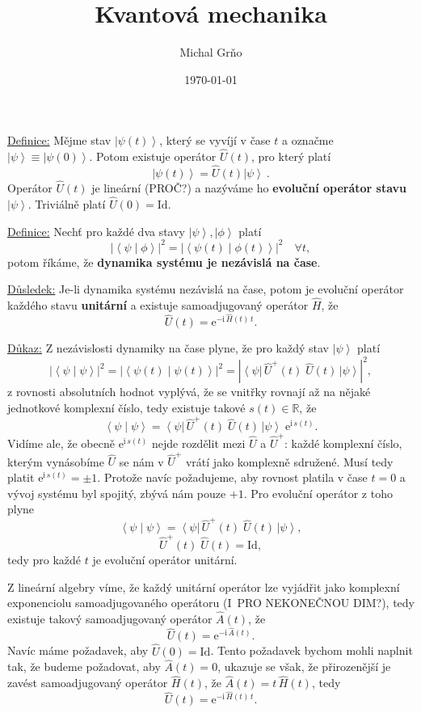 \documentclass[10pt,a4paper]{article}
\newcommand{\const}[1]{\text{#1}}
\newcommand{\abs}[1]{\left| #1 \right|}
\newcommand{\bra}[1]{\left< #1 \right|}
\newcommand{\ket}[1]{\left| #1 \right>}
\newcommand{\braket}[2]{\left< #1 \middle| #2 \right>}
\newcommand{\e}[1]{\const{e}^{#1}}
\renewcommand{\i}{\const{i}}
\def\R{\mathbb{R}}
\def\1{\const{Id}}
\begin{document}
\title{Kvantová mechanika}
\author{Michal Grňo}
\date{\today}

\maketitle

\underline{Definice:}
Mějme stav $\ket{\psi(t)}$, který se vyvíjí v čase $t$ a označme $\ket{\psi} \equiv \ket{\psi(0)}$. Potom existuje operátor $\hat{U}(t)$, pro který platí $$\ket{\psi(t)} = \hat{U}(t) \ket{\psi} \: .$$ Operátor $\hat{U}(t)$ je lineární (PROČ?) a nazýváme ho \textbf{evoluční operátor stavu} $\ket{\psi}$. Triviálně platí $\hat{U}(0) = \1$.

\vspace{2em}
\underline{Definice:}
Nechť pro každé dva stavy $\ket{\psi}, \ket{\phi}$ platí $$\abs{\braket{\psi}{\phi}}^2 = \abs{\braket{\psi(t)}{\phi(t)}}^2 \quad \forall t,$$ potom říkáme, že \textbf{dynamika systému je nezávislá na čase}.

\vspace{2em}
\underline{Důsledek:}
Je-li dynamika systému nezávislá na čase, potom je evoluční operátor každého stavu \textbf{unitární} a existuje samoadjugovaný operátor $\hat{H}$, že $$\hat{U}(t) = \e{-\i \, \hat{H}(t) \, t}.$$

\underline{Důkaz:}
Z nezávislosti dynamiky na čase plyne, že pro každý stav $\ket{\psi}$ platí $$\abs{\braket{\psi}{\psi}}^2 = \abs{\braket{\psi(t)}{\psi(t)}}^2 = \abs{\bra{\psi} \, \hat{U}^+\!(t) \; \hat{U}(t) \, \ket{\psi}}^2,$$ z rovnosti absolutních hodnot vyplývá, že se vnitřky rovnají až na nějaké jednotkové komplexní číslo, tedy existuje takové $s(t) \in \R$, že $$\braket{\psi}{\psi} = \bra{\psi} \, \hat{U}^+\!(t) \; \hat{U}(t) \, \ket{\psi} \; \e{\i \, s(t)}.$$ Vidíme ale, že obecně $\e{\i \, s(t)}$ nejde rozdělit mezi $\hat{U}$ a $\hat{U}^+$: každé komplexní číslo, kterým vynásobíme $\hat{U}$ se nám v $\hat{U}^+$ vrátí jako komplexně sdružené. Musí tedy platit $\e{\i \, s(t)} = \pm 1$. Protože navíc požadujeme, aby rovnost platila v čase $t=0$ a vývoj systému byl spojitý, zbývá nám pouze $+1$. Pro evoluční operátor z toho plyne $$\braket{\psi}{\psi} = \bra{\psi} \, \hat{U}^+\!(t) \; \hat{U}(t) \, \ket{\psi},$$ $$\hat{U}^+ \!(t) \; \hat{U}(t) = \1,$$ tedy pro každé $t$ je evoluční operátor unitární.

Z lineární algebry víme, že každý unitární operátor lze vyjádřit jako komplexní exponenciolu samoadjugovaného operátoru (I~PRO NEKONEČNOU DIM?), tedy existuje takový samoadjugovaný operátor $\hat{A}(t)$, že $$\hat{U}(t) = \e{-\i \, \hat{A}(t)}.$$ Navíc máme požadavek, aby $\hat{U}(0) = \1$. Tento požadavek bychom mohli naplnit tak, že budeme požadovat, aby $\hat{A}(t) = 0$, ukazuje se však, že přirozenější je zavést samoadjugovaný operátor $\hat{H}(t)$, že $\hat{A}(t) = t \, \hat{H}(t)$, tedy $$\hat{U}(t) = \e{-\i \, \hat{H}(t) \, t}.$$
\end{document}
